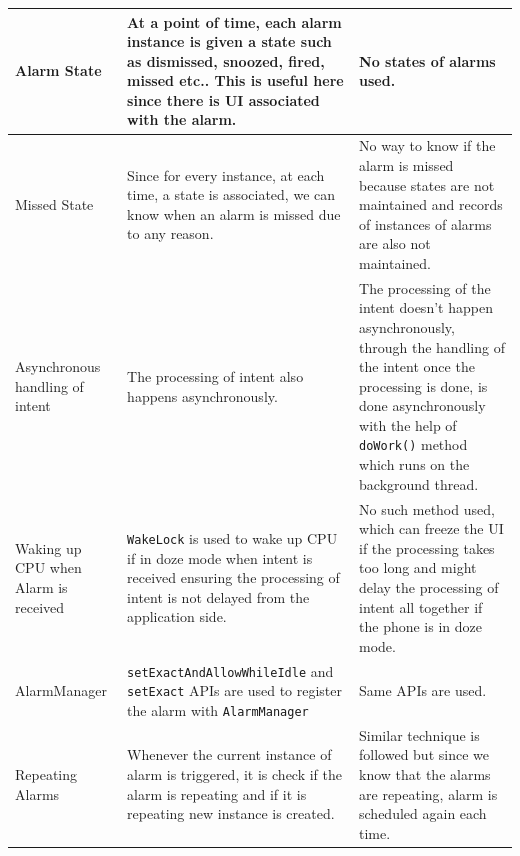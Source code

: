 \documentclass{article}
\begin{document}
\begin{longtable}{|p{3cm}|p{5.5cm}|p{5.5cm}|}
Alarm State & 
At a point of time, each alarm instance is given a state such as dismissed, snoozed, fired, missed etc.. This is useful here since there is UI associated with the alarm. & 
No states of alarms used. \\
\hline

Missed State & 
Since for every instance, at each time, a state is associated, we can know when an alarm is missed due to any reason. &
No way to know if the alarm is missed because states are not maintained and records of instances of alarms are also not maintained. \\
\hline

Asynchronous handling of intent & 
The processing of intent also happens asynchronously. &
The processing of the intent doesn't happen asynchronously, through the handling of the intent once the processing is done, is done asynchronously with the help of \texttt{doWork()} method which runs on the background thread. \\
\hline

Waking up CPU when Alarm is received & 
\texttt{WakeLock} is used to wake up CPU if in doze mode when intent is received ensuring the processing of intent is not delayed from the application side.&
No such method used, which can freeze the UI if the processing takes too long and might delay the processing of intent all together if the phone is in doze mode. \\
\hline

AlarmManager& 
\texttt{setExactAndAllowWhileIdle} and \texttt{setExact} APIs are used to register the alarm with \texttt{AlarmManager}&
Same APIs are used. \\
\hline

Repeating Alarms& 
Whenever the current instance of alarm is triggered, it is check if the alarm is repeating and if it is repeating new instance is created.&
Similar technique is followed but since we know that the alarms are repeating, alarm is scheduled again each time. \\
\hline

\end{longtable}
\end{document}
